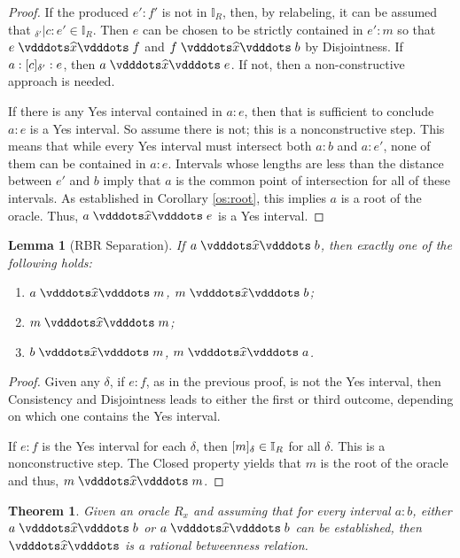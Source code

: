 \documentclass[12pt]{article}
\newtheorem{theorem}{Theorem}[section]
\newtheorem{lemma}{Lemma}[section]
\begin{document}
\begin{proof}
    If the produced $e':f'$ is not in $\mathbb{I}_R$, then, by relabeling, it can be assumed that ${}_{\delta'} |c:e' \in \mathbb{I}_R$. Then $e$ can be chosen to be strictly contained in $e':m$ so that \sout{$e\xora f$} and \sout{$f\xora b$} by Disjointness. If $a:\halo[\delta']{c}:e$, then $a \xora e$. If not, then a non-constructive approach is needed.

    If there is any Yes interval contained in $a:e$, then that is sufficient to conclude $a:e$ is a Yes interval. So assume there is not; this is a nonconstructive step. This means that while every Yes interval must intersect both $a:b$ and $a:e'$, none of them can be contained in $a:e$. Intervals whose lengths are less than the distance between $e'$ and $b$ imply that $a$ is the common point of intersection for all of these intervals. As established in Corollary \ref{os:root}, this implies $a$ is a root of the oracle. Thus, $a \xora e$ is a Yes interval. 

\end{proof}

\begin{lemma}[RBR Separation]\label{os:intsep}
  If $a \xora b$, then exactly one of the following holds: 
  \begin{enumerate}
        \item $a\xora m$, \sout{$m \xora b$};
        \item $m \xora m$; 
        \item $b \xora m$, \sout{$m \xora a$}.
    \end{enumerate}
\end{lemma}

\begin{proof}
Given any $\delta$, if $e:f$, as in the previous proof, is not the Yes interval, then Consistency and Disjointness leads to either the first or third outcome, depending on which one contains the Yes interval. 

If $e:f$ is the Yes interval for each $\delta$, then $\halo{m} \in \mathbb{I}_R$ for all $\delta$. This is a nonconstructive step. The Closed property yields that $m$ is the root of the oracle and thus, $m \xora m$.
\end{proof}


\begin{theorem}
    Given an oracle $R_x$ and assuming that for every interval $a:b$, either $a \xora b$ or \sout{$a \xora b$} can be established, then $\xora$ is a rational betweenness relation. 
\end{theorem}
\end{document}

